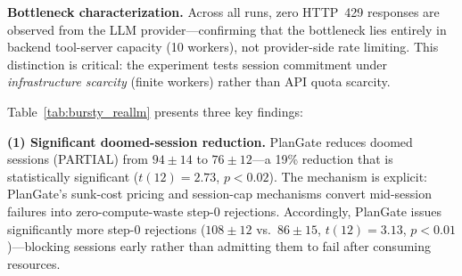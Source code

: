 \documentclass[sigconf,review,anonymous]{acmart}
\begin{document}
\textbf{Bottleneck characterization.}
Across all runs, zero HTTP~429 responses are observed from the LLM provider---confirming that the bottleneck lies entirely in backend tool-server capacity (10 workers), not provider-side rate limiting. This distinction is critical: the experiment tests session commitment under \emph{infrastructure scarcity} (finite workers) rather than API quota scarcity.

\begin{table}[t]
\caption{Bursty real-LLM validation ($N{=}7$, mean$\pm$std). Burst arrival: 30 sessions per burst, $C{=}20$, 10 backend workers. PARTIAL = doomed sessions (sessions that begin execution but ultimately fail).}
\label{tab:bursty_reallm}
\small
{}
\end{table}

Table~\ref{tab:bursty_reallm} presents three key findings:

\noindent\textbf{(1) Significant doomed-session reduction.}
PlanGate reduces doomed sessions (PARTIAL) from $94\pm14$ to $76\pm12$---a 19\% reduction that is statistically significant ($t(12){=}2.73$, $p{<}0.02$). The mechanism is explicit: PlanGate's sunk-cost pricing and session-cap mechanisms convert mid-session failures into zero-compute-waste step-0 rejections. Accordingly, PlanGate issues significantly more step-0 rejections ($108\pm12$ vs.\ $86\pm15$, $t(12){=}3.13$, $p{<}0.01$)---blocking sessions early rather than admitting them to fail after consuming resources.
\end{document}

